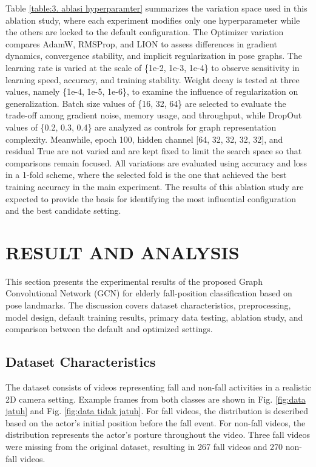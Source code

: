 \documentclass[10pt,TimesNewRoman,a4paper]{matrikenglish}
\begin{document}
Table \ref{table:3. ablasi hyperparamter} summarizes the variation space used in this ablation study, where each experiment modifies only one hyperparameter while the others are locked to the default configuration. The Optimizer variation compares AdamW, RMSProp, and LION to assess differences in gradient dynamics, convergence stability, and implicit regularization in pose graphs. The learning rate is varied at the scale of \{1e-2, 1e-3, 1e-4\} to observe sensitivity in learning speed, accuracy, and training stability. Weight decay is tested at three values, namely \{1e-4, 1e-5, 1e-6\}, to examine the influence of regularization on generalization. Batch size values of \{16, 32, 64\} are selected to evaluate the trade-off among gradient noise, memory usage, and throughput, while DropOut values of \{0.2, 0.3, 0.4\} are analyzed as controls for graph representation complexity. Meanwhile, epoch 100, hidden channel [64, 32, 32, 32, 32], and residual True are not varied and are kept fixed to limit the search space so that comparisons remain focused. All variations are evaluated using accuracy and loss in a 1-fold scheme, where the selected fold is the one that achieved the best training accuracy in the main experiment. The results of this ablation study are expected to provide the basis for identifying the most influential configuration and the best candidate setting. \par


\section{RESULT AND ANALYSIS}
\label{}

This section presents the experimental results of the proposed Graph Convolutional Network (GCN) for elderly fall-position classification based on pose landmarks. The discussion covers dataset characteristics, preprocessing, model design, default training results, primary data testing, ablation study, and comparison between the default and optimized settings.

\subsection{Dataset Characteristics}
\label{IV.analisis}

The dataset consists of videos representing fall and non-fall activities in a realistic 2D camera setting. Example frames from both classes are shown in Fig. \ref{fig:data jatuh} and Fig. \ref{fig:data tidak jatuh}. For fall videos, the distribution is described based on the actor's initial position before the fall event. For non-fall videos, the distribution represents the actor's posture throughout the video. Three fall videos were missing from the original dataset, resulting in 267 fall videos and 270 non-fall videos.
\end{document}
